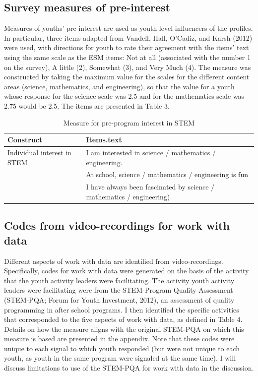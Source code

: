 \documentclass[]{book}
\theoremstyle{definition}
\theoremstyle{definition}
\theoremstyle{definition}
\theoremstyle{remark}
\begin{document}
\subsection{Survey measures of
pre-interest}\label{survey-measures-of-pre-interest}

Measures of youths' pre-interest are used as youth-level influencers of
the profiles. In particular, three items adapted from Vandell, Hall,
O'Cadiz, and Karsh (2012) were used, with directions for youth to rate
their agreement with the items' text using the same scale as the ESM
items: Not at all (associated with the number 1 on the survey), A little
(2), Somewhat (3), and Very Much (4). The measure was constructed by
taking the maximum value for the scales for the different content areas
(science, mathematics, and engineering), so that the value for a youth
whose response for the science scale was 2.5 and for the mathematics
scale was 2.75 would be 2.5. The items are presented in Table 3.

\begin{table}

\caption{\label{tab:unnamed-chunk-5}Measure for pre-program interest in STEM}
\centering
\begin{tabular}[t]{ll}
\toprule
Construct & Items.text\\
\midrule
Individual interest in STEM & I am interested in science / mathematics / engineering.\\
 & At school, science / mathematics / engineering is fun\\
 & I have always been fascinated by science / mathematics / engineering)\\
\bottomrule
\end{tabular}
\end{table}

\subsection{Codes from video-recordings for work with
data}\label{codes-from-video-recordings-for-work-with-data}

Different aspects of work with data are identified from
video-recordings. Specifically, codes for work with data were generated
on the basis of the activity that the youth activity leaders were
facilitating. The activity youth activity leaders were facilitating were
from the STEM-Program Quality Assessment (STEM-PQA; Forum for Youth
Investment, 2012), an assessment of quality programming in after school
programs. I then identified the specific activities that corresponded to
the five aspects of work with data, as defined in Table 4. Details on
how the measure aligns with the original STEM-PQA on which this measure
is based are presented in the appendix. Note that these codes were
unique to each signal to which youth responded (but were not unique to
each youth, as youth in the same program were signaled at the same
time). I will discuss limitations to use of the STEM-PQA for work with
data in the discussion.
\end{document}
